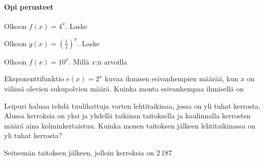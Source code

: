 \begin{tehtavasivu}

\paragraph*{Opi perusteet}

\begin{tehtava}
Olkoon $f(x) = 4^x$. Laske
\begin{vastaus}
\end{vastaus}
\end{tehtava}

\begin{tehtava}
Olkoon $g(x) = (\frac{1}{4})^x$. Laske
\begin{vastaus}
\end{vastaus}
\end{tehtava}

\begin{tehtava}
Olkoon $f(x) = 10^x$. Millä $x$:n arvoilla
\begin{vastaus}
\end{vastaus}
\end{tehtava}

\begin{tehtava}
Eksponenttifunktio $ e(x)=2^{x}$ kuvaa ihmisen esivanhempien määrää, kun $ x $ on välissä olevien sukupolvien määrä. Kuinka monta esivanhempaa ihmisellä on
\begin{vastaus}
\end{vastaus}
\end{tehtava}

\begin{tehtava}
Leipuri haluaa tehdä tuulihattuja varten lehtitaikinaa, jossa on yli tuhat kerrosta. Alussa kerroksia on yksi ja yhdellä taikinan taitoksella ja kaulinnalla kerrosten määrä aina kolminkertaistuu. Kuinka monen taitoksen jälkeen lehtitaikinassa on yli tuhat kerrosta?
\begin{vastaus}
Seitsemän taitoksen jälkeen, jolloin kerroksia on $2\,187$
\end{vastaus}
\end{tehtava}


\end{tehtavasivu}
